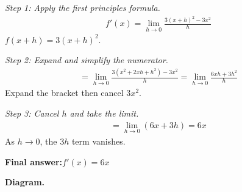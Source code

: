\documentclass[11pt]{article}
\begin{document}
\textit{Step 1: Apply the first principles formula.}
\[\begin{gathered}
f'(x) = \lim_{h \to 0} \frac{3(x+h)^2 - 3x^2}{h}
\end{gathered}\]
\( f(x+h) = 3(x+h)^2 \).

\textit{Step 2: Expand and simplify the numerator.}
\[\begin{gathered}
= \lim_{h \to 0} \frac{3(x^2 + 2xh + h^2) - 3x^2}{h} = \lim_{h \to 0} \frac{6xh + 3h^2}{h}
\end{gathered}\]
Expand the bracket then cancel \( 3x^2 \).

\textit{Step 3: Cancel \( h \) and take the limit.}
\[\begin{gathered}
= \lim_{h \to 0} (6x + 3h) = 6x
\end{gathered}\]
As \( h \to 0 \), the \( 3h \) term vanishes.

\begin{answerbox}
\textbf{Final answer:}\quad \(\displaystyle  f'(x) = 6x \)
\end{answerbox}
\textbf{Diagram.}
\end{document}
